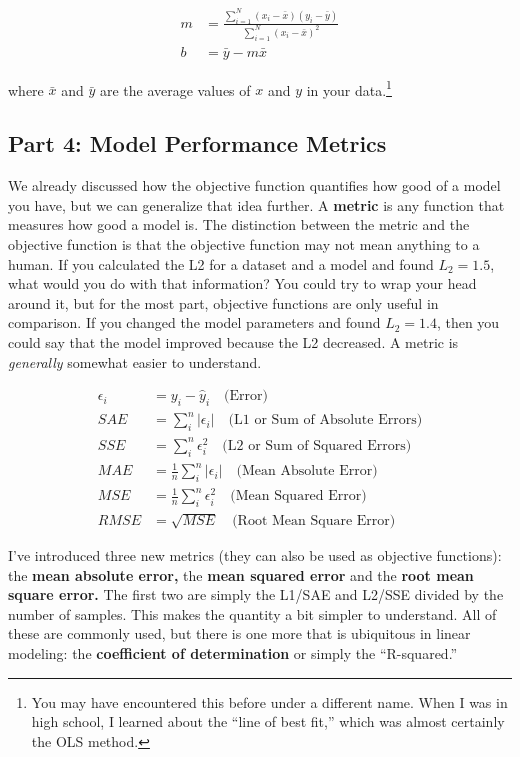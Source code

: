\begin{align}
    m &= \frac{\sum_{i=1}^{N} (x_i - \bar{x})(y_i - \bar{y})}{\sum_{i=1}^{N} (x_i - \bar{x})^2} \\
    b &= \bar{y} - m\bar{x}
\end{align}

\noindent where $\bar{x}$ and $\bar{y}$ are the average values of $x$ and $y$ in your data.\footnote{You may have encountered this before under a different name. When I was in high school, I learned about the ``line of best fit,'' which was almost certainly the OLS method.}

\subsection*{Part 4: Model Performance Metrics}
We already discussed how the objective function quantifies how good of a model you have, but we can generalize that idea further. A \textbf{metric} is any function that measures how good a model is. The distinction between the metric and the objective function is that the objective function may not mean anything to a human. If you calculated the L2 for a dataset and a model and found $L_2 = 1.5$, what would you do with that information? You could try to wrap your head around it, but for the most part, objective functions are only useful in comparison. If you changed the model parameters and found $L_2=1.4$, then you could say that the model improved because the L2 decreased. A metric is \textit{generally} somewhat easier to understand.

\begin{align}
    \epsilon_i &= y_i - \hat{y}_i \quad \text{(Error)} \\
    SAE &= \sum_i^n |\epsilon_i| \quad \text{(L1 or Sum of Absolute Errors)} \\
    SSE &= \sum_i^n \epsilon_i^2 \quad \text{(L2 or Sum of Squared Errors)} \\
    MAE &= \frac{1}{n} \sum_i^n |\epsilon_i| \quad \text{(Mean Absolute Error)} \\
    MSE &= \frac{1}{n} \sum_i^n \epsilon_i^2 \quad \text{(Mean Squared Error)} \\
    RMSE &= \sqrt{MSE} \quad \text{(Root Mean Square Error)}
\end{align}

\noindent I've introduced three new metrics (they can also be used as objective functions): the \textbf{mean absolute error,} the \textbf{mean squared error} and the \textbf{root mean square error.} The first two are simply the L1/SAE and L2/SSE divided by the number of samples. This makes the quantity a bit simpler to understand. All of these are commonly used, but there is one more that is ubiquitous in linear modeling: the \textbf{coefficient of determination} or simply the ``R-squared.''

